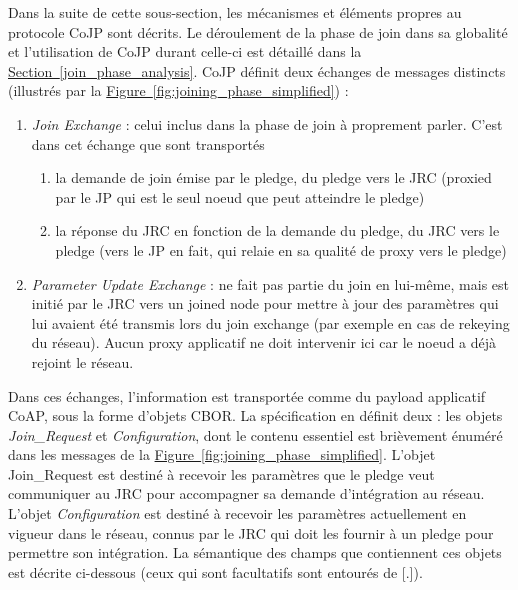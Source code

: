 \documentclass[]{report}
\newcommand{\wordlink}[2]{\hyperref[#2]{#1~\ref{#2}}}
\begin{document}
Dans la suite de cette sous-section, les mécanismes et éléments propres au protocole CoJP sont décrits. Le déroulement de la phase de join dans sa globalité et l'utilisation de CoJP durant celle-ci est détaillé dans la \wordlink{Section}{join_phase_analysis}. CoJP définit deux échanges de messages distincts (illustrés par la \wordlink{Figure}{fig:joining_phase_simplified}) :
\vspace{0.3cm}
\begin{enumerate}
\item \textit{Join Exchange} : celui inclus dans la phase de join à proprement parler. C'est dans cet échange que sont transportés 
	\begin{enumerate}
	\item la demande de join émise par le pledge, du pledge vers le JRC (proxied par le JP qui est le seul noeud que peut atteindre le pledge)
	\item la réponse du JRC en fonction de la demande du pledge, du JRC vers le pledge (vers le JP en fait, qui relaie en sa qualité de proxy vers le pledge)
	\end{enumerate}
\vspace{0.2cm}	
\item \textit{Parameter Update Exchange} : ne fait pas partie du join en lui-même, mais est initié par le JRC vers un joined node pour mettre à jour des paramètres qui lui avaient été transmis lors du join exchange (par exemple en cas de rekeying du réseau). Aucun proxy applicatif ne doit intervenir ici car le noeud a déjà rejoint le réseau.
\end{enumerate} 
\vspace{0.3cm}

Dans ces échanges, l'information est transportée comme du payload applicatif CoAP, sous la forme d'objets CBOR. La spécification \cite{ietf-6tisch-minimal-security-15}  en définit deux : les objets \textit{Join\_Request} et \textit{Configuration}, dont le contenu essentiel est brièvement énuméré dans les messages de la \wordlink{Figure}{fig:joining_phase_simplified}. L'objet Join\_Request est destiné à recevoir les paramètres que le pledge veut communiquer au JRC pour accompagner sa demande d'intégration au réseau. L'objet \textit{Configuration} est destiné à recevoir les paramètres actuellement en vigueur dans le réseau, connus par le JRC qui doit les fournir à un pledge pour permettre son intégration. La sémantique des champs que contiennent ces objets est décrite ci-dessous (ceux qui sont facultatifs sont entourés de [.]).\\
\end{document}
